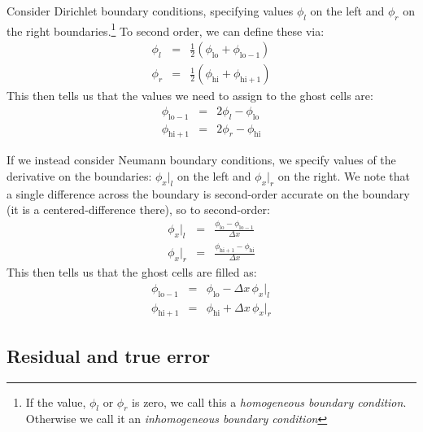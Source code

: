 Consider Dirichlet boundary conditions, specifying values $\phi_l$ on
the left and $\phi_r$ on the right boundaries.\footnote{If the value, $\phi_l$
  or $\phi_r$ is zero, we call this a {\em homogeneous boundary condition}.  Otherwise
  we call it an {\em inhomogeneous boundary condition}}  To second order, we can
define these via:
\begin{eqnarray}
\phi_l &=& \frac{1}{2} ( \phi_\mathrm{lo} + \phi_\mathrm{lo-1} ) \\
\phi_r &=& \frac{1}{2} ( \phi_\mathrm{hi} + \phi_\mathrm{hi+1} )
\end{eqnarray}
This then tells us that the values we need to assign to the ghost cells are:
\begin{eqnarray}
\label{eq:bc_inhomo_dir}
\phi_\mathrm{lo-1} &=& 2 \phi_l - \phi_\mathrm{lo} \\
\phi_\mathrm{hi+1} &=& 2 \phi_r - \phi_\mathrm{hi}
\end{eqnarray}

If we instead consider Neumann boundary conditions, we specify values
of the derivative on the boundaries: $\phi_x |_l$ on the left and
$\phi_x |_r$ on the right.  We note that a single difference across
the boundary is second-order accurate on the boundary (it is a
centered-difference there), so to second-order:
\begin{eqnarray}
\phi_x |_l &=& \frac{\phi_\mathrm{lo} - \phi_\mathrm{lo-1}}{\Delta x} \\
\phi_x |_r &=& \frac{\phi_\mathrm{hi+1} - \phi_\mathrm{hi}}{\Delta x}
\end{eqnarray}
This then tells us that the ghost cells are filled as:
\begin{eqnarray}
\label{eq:bc_inhomo_neum}
\phi_\mathrm{lo-1} &=& \phi_\mathrm{lo} - \Delta x \, \phi_x |_l \\
\phi_\mathrm{hi+1} &=& \phi_\mathrm{hi} + \Delta x \, \phi_x |_r
\end{eqnarray}


\subsection{Residual and true error}

